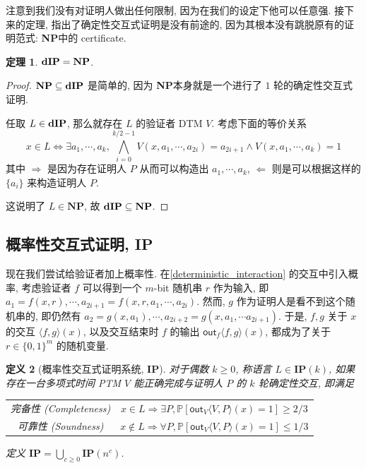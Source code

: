 \documentclass[8pt]{article}
\theoremstyle{compact}
\newtheorem{theorem}{定理}[section]
\newtheorem{definition}[theorem]{定义}
\def\le{\leqslant}
\def\ge{\geqslant}
\def\NP{\textbf{NP}}
\begin{document}
注意到我们没有对证明人做出任何限制, 因为在我们的设定下他可以任意强. 接下来的定理, 指出了确定性交互式证明是没有前途的, 因为其根本没有跳脱原有的证明范式: \NP 中的 certificate.

\begin{theorem}
	$\dIP = \NP$.
\end{theorem}
\begin{proof}
	$\NP \subseteq \dIP$ 是简单的, 因为 \NP 本身就是一个进行了 $1$ 轮的确定性交互式证明.

	任取 $L \in \textbf{dIP}$, 那么就存在 $L$ 的验证者 DTM $V$. 考虑下面的等价关系 $$x \in L \Leftrightarrow \exists a_1, \cdots, a_k, \bigwedge_{i=0}^{k/2-1}V(x, a_1, \cdots, a_{2i}) = a_{2i+1} \wedge V(x, a_1, \cdots, a_k) = 1$$ 其中 $\Rightarrow$ 是因为存在证明人 $P$ 从而可以构造出 $a_1, \cdots, a_k$, $\Leftarrow$ 则是可以根据这样的 $\{a_i\}$ 来构造证明人 $P$.

	这说明了 $L \in \NP$, 故 $\dIP \subseteq \NP$.
\end{proof}

\def\IP{\textbf{IP}}
\subsection{概率性交互式证明, \IP}
现在我们尝试给验证者加上概率性. 在\cref{deterministic_interaction} 的交互中引入概率, 考虑验证者 $f$ 可以得到一个 $m$-bit 随机串 $r$ 作为输入, 即 $a_1 = f(x, r), \cdots, a_{2i+1} = f(x, r, a_1, \cdots, a_{2i})$. 然而, $g$ 作为证明人是看不到这个随机串的, 即仍然有 $a_2 = g(x, a_1), \cdots, a_{2i+2} = g(x, a_1, \cdots a_{2i+1})$. 于是, $f, g$ 关于 $x$ 的交互 $\langle f, g \rangle(x)$, 以及交互结束时 $f$ 的输出 $\textsf{out}_f\langle f, g \rangle (x)$, 都成为了关于 $r \in \{0, 1\}^m$ 的随机变量.

\begin{definition}[概率性交互式证明系统, \IP]
	对于偶数 $k \ge 0$, 称语言 $L \in \IP(k)$, 如果存在一台多项式时间 PTM $V$ 能正确完成与证明人 $P$ 的 $k$ 轮确定性交互, 即满足 \begin{center}
		\begin{tabular}{cc}
			完备性 (Completeness) & $x \in L \Rightarrow \exists P, \mathbb P[\textsf{out}_V\langle V, P\rangle(x) = 1] \ge 2/3$ \\
			可靠性 (Soundness) & $x \notin L \Rightarrow \forall P, \mathbb P[\textsf{out}_V\langle V, P\rangle(x) = 1] \le 1/3$ \\
		\end{tabular}
	\end{center}

	定义 $\IP = \bigcup_{c \ge 0}\IP(n^c)$.
\end{definition}
\end{document}
